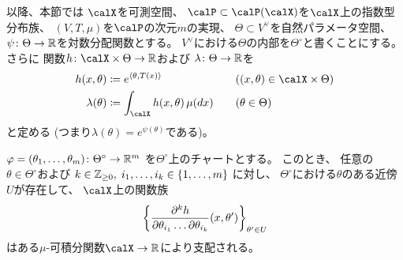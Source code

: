 \documentclass[report]{jlreq}
\begin{document}

以降、本節では
$\calX$を可測空間、
$\calP \subset \calP(\calX)$を$\calX$上の指数型分布族、
$(V, T, \mu)$を$\calP$の次元$m$の実現、
$\Theta \subset V^\vee$を自然パラメータ空間、
$\psi \colon \Theta \to \mathbb{R}$を対数分配関数とする。
$V^\vee$における$\Theta$の内部を$\Theta^\circ$と書くことにする。
さらに
関数$h \colon \calX \times \Theta \to \R$および
$\lambda \colon \Theta \to \mathbb{R}$を
\begin{alignat}{2}
    h(x, \theta)
        &\coloneqq e^{\langle \theta, T(x) \rangle}
        &&\quad ((x, \theta) \in \calX \times \Theta) \\
    \lambda(\theta)
        &\coloneqq \int_\calX h(x, \theta) \, \mu(dx)
        &&\quad (\theta \in \Theta)
\end{alignat}
と定める (つまり$\lambda(\theta) = e^{\psi(\theta)}$である)。


\begin{lemma}[優関数の存在]
    $\varphi = (\theta_1, \dots, \theta_m) \colon \Theta^\circ \to \mathbb{R}^m$
    を$\Theta^\circ$上のチャートとする。
    このとき、
    任意の$\theta \in \Theta^\circ$および
    $k \in \mathbb{Z}_{\ge 0}, \;
        i_1, \dots, i_k \in \{ 1, \dots, m \}$
    に対し、
    $\Theta^\circ$における$\theta$のある近傍$U$が存在して、
    $\calX$上の関数族
    \begin{equation}
        \left\{{
            \frac{\partial^k h}{\partial \theta_{i_1} \dots \partial \theta_{i_k}}(x, \theta')
        }\right\}_{\theta' \in U}
    \end{equation}
    はある$\mu$-可積分関数$\calX \to \R$により支配される。
\end{lemma}
\end{document}
